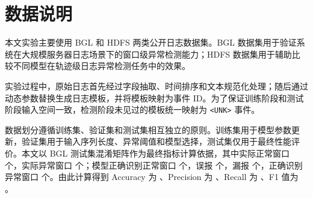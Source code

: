 \chapter{数据说明}

本文实验主要使用 BGL 和 HDFS 两类公开日志数据集。BGL 数据集用于验证系统在大规模服务器日志场景下的窗口级异常检测能力；HDFS 数据集用于辅助比较不同模型在轨迹级日志异常检测任务中的效果。

实验过程中，原始日志首先经过字段抽取、时间排序和文本规范化处理；随后通过动态参数替换生成日志模板，并将模板映射为事件 ID。为了保证训练阶段和测试阶段输入空间一致，检测阶段未见过的模板统一映射为 \texttt{<UNK>} 事件。

数据划分遵循训练集、验证集和测试集相互独立的原则。训练集用于模型参数更新，验证集用于输入序列长度、异常阈值和模型选择，测试集仅用于最终性能评价。本文以 BGL 测试集混淆矩阵作为最终指标计算依据，其中实际正常窗口  个，实际异常窗口  个；模型正确识别正常窗口  个，误报  个，漏报  个，正确识别异常窗口  个。由此计算得到 Accuracy 为 、Precision 为 、Recall 为 、F1 值为 。

